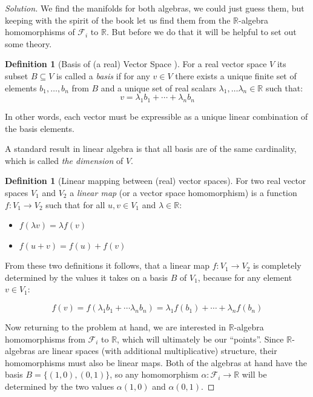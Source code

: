\documentclass[11pt,a4paper]{article}
\theoremstyle{plain}
\theoremstyle{definition}
\newtheorem{definition}[theorem]{Definition}
\theoremstyle{remark}
\newenvironment{solution}
  {\begin{proof}[Solution]}
  {\end{proof}}
\newcommand{\R}{\mathbb{R}}
\newcommand{\F}{\mathcal{F}}            %
\begin{document}
\begin{solution}
We find the manifolds for both algebras, we could just guess them, but keeping with the spirit of the book let us find them from the $\R$-algebra homomorphisms of $\F_i$ to $\R$. But before we do that it will be helpful to set out some theory.

\begin{definition}[Basis of (a real) Vector Space ]
  For a real vector space $V$ its subset $B\subseteq V$ is called a \textit{basis} if for any $v\in V$ there exists a unique finite set of elements $b_1, \dots, b_n$ from $B$ and a unique set of real scalars $\lambda_1, \dots \lambda_n \in \R$ such that:
$$v=\lambda_1 b_1+\cdots+\lambda_n b_n $$

In other words, each vector must be expressible as a unique linear combination of the basis elements.
\end{definition}

A standard result in linear algebra is that all basis are of the same cardinality, which is called \textit{the dimension} of $V$.

\begin{definition}[Linear mapping between (real) vector spaces]
  For two real vector spaces $V_1$ and $V_2$ a \textit{linear map} (or a vector space homomorphism) is a function $f:V_1\to V_2$ such that for all $u,v\in V_1$ and $\lambda\in \R$:
\begin{itemize}
  \item $f(\lambda v)=\lambda f(v)$
  \item $f(u+v)=f(u)+f(v)$
\end{itemize}

\end{definition}

From these two definitions it follows, that a linear map $f:V_1\to V_2$ is completely determined by the values it takes on a basis $B$ of $V_1$, because for any element $v\in V_1$:

$$f(v)=f(\lambda_1 b_1+ \cdots\lambda_n b_n)=\lambda_1 f(b_1)+\cdots +\lambda_n f(b_n) $$


Now returning to the problem at hand, we are interested in $\R$-algebra homomorphisms from $\F_i$ to $\R$, which will ultimately be our ``points''. Since $\R$-algebras are linear spaces (with additional multiplicative) structure, their homomorphisms must also be linear maps. Both of the algebras at hand have the basis $B=\{(1,0), (0,1)\}$, so any homomorphism $\alpha :\F_i\to \R$ will be determined by the two values $\alpha(1,0)$ and $\alpha (0,1)$.


\end{solution}
\end{document}
